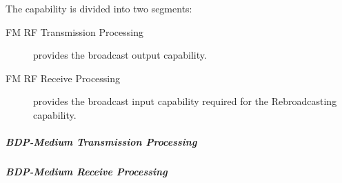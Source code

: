 The \ThisSegment \FM capability is divided into two segments:
\begin{description}
	\item[FM RF Transmission Processing] provides the \FM broadcast output capability.%
	\item[FM RF Receive Processing]  provides the \FM broadcast input  capability required for the Rebroadcasting capability.%
\end{description}

\subparagraph{BDP-Medium \FM \RF Transmission Processing}
\label{loc:Medium_RF_FM_Transmission}
\renewcommand{\ThisSubSegment}{BDP-Medium FM RF\xspace}%


\subparagraph{BDP-Medium \FM \RF Receive Processing}
\label{loc:Medium_RF_FM_Receive}
\renewcommand{\ThisSubSegment}{BDP-Medium FM RF\xspace}%

